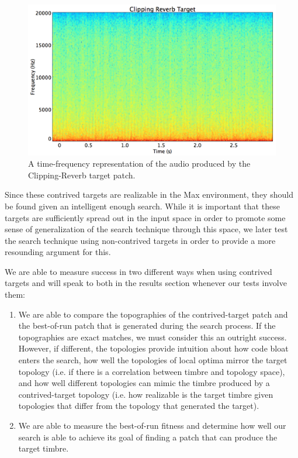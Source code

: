 \documentclass[12pt]{report} 	%
\numberwithin{figure}{chapter}
\numberwithin{table}{chapter}
\numberwithin{equation}{chapter}
\begin{document}
\begin{flushleft}
\begin{figure}[h!]
\begin{center}
\includegraphics[scale=0.35,width=\linewidth]{ClippingReverbTargetSTFT}
\caption[Clipping reverb sawtooth time-frequency representation]{A time-frequency representation of the audio produced by the Clipping-Reverb target patch.}
\end{center}
\end{figure}
Since these contrived targets are realizable in the Max environment, they should be found given an intelligent enough search. While it is important that these targets are sufficiently spread out in the input space in order to promote some sense of generalization of the search technique through this space, we later test the search technique using non-contrived targets in order to provide a more resounding argument for this.

We are able to measure success in two different ways when using contrived targets and will speak to both in the results section whenever our tests involve them:
\begin{enumerate}
\item We are able to compare the topographies of the contrived-target patch and the best-of-run patch that is generated during the search process. If the topographies are exact matches, we must consider this an outright success. However, if different, the topologies provide intuition about how code bloat enters the search, how well the topologies of local optima mirror the target topology (i.e. if there is a correlation between timbre and topology space), and how well different topologies can mimic the timbre produced by a contrived-target topology (i.e. how realizable is the target timbre given topologies that differ from the topology that generated the target).
\item We are able to measure the best-of-run fitness and determine how well our search is able to achieve its goal of finding a patch that can produce the target timbre.
\end{enumerate}


\end{flushleft}
\end{document}
